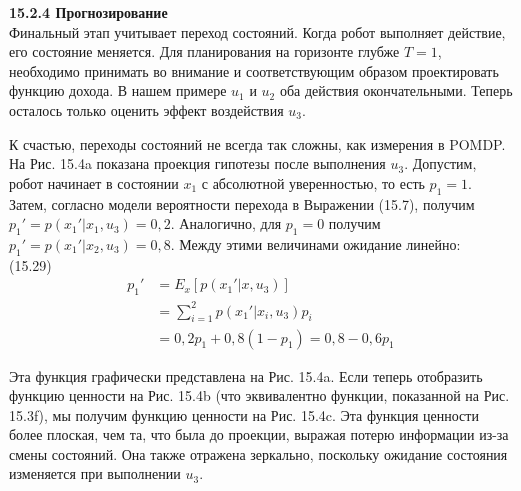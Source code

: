 \documentclass[10pt,a4paper]{article}
\begin{document}
\textbf{15.2.4	Прогнозирование}\\

Финальный этап учитывает переход состояний. Когда робот выполняет действие, его состояние меняется. Для планирования на горизонте глубже $T = 1$, необходимо принимать во внимание и соответствующим образом проектировать функцию дохода. В нашем примере $u_1$ и $u_2$ оба действия окончательными. Теперь осталось только оценить эффект воздействия $u_3$.

К счастью, переходы состояний не всегда так сложны, как измерения в POMDP. На Рис. 15.4a показана проекция гипотезы после выполнения $u_3$. Допустим, робот начинает в состоянии $x_1$ с абсолютной уверенностью, то есть $p_1 = 1$. Затем, согласно модели вероятности перехода в Выражении (15.7),  получим $p_1'  =  p(x_1'|x_1, u_3)=0,2$. Аналогично, для $p_1=0$ получим  $p_1' = p(x_1'|x_2, u_3) = 0,8$. Между этими величинами ожидание линейно:\\

(15.29)
\begin{equation*}
\begin{split}
p_1'&=E_x[p(x_1'|x,u_3)]\\
&=\sum_{i=1}^2 p(x_1'|x_i,u_3)p_i\\
&=0,2p_1+0,8(1-p_1)=0,8-0,6p_1
\end{split}
\end{equation*}

Эта функция графически представлена на Рис. 15.4a. Если теперь отобразить функцию ценности на Рис. 15.4b (что эквивалентно функции, показанной на Рис. 15.3f), мы получим функцию ценности на Рис. 15.4c. Эта функция ценности более плоская, чем та, что была до проекции, выражая потерю информации из-за смены состояний. Она также отражена зеркально, поскольку ожидание состояния изменяется при выполнении $u_3$.
\end{document}
